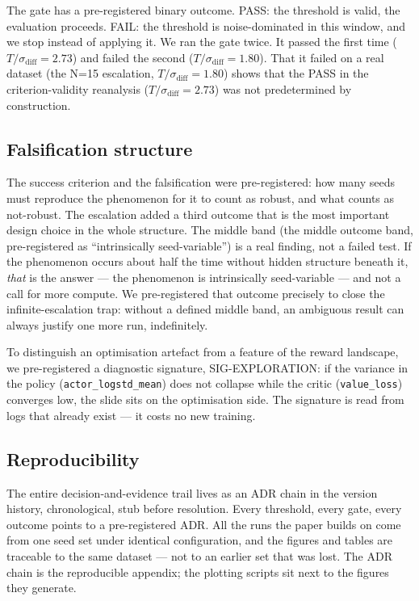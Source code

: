 \documentclass{article}
\newcommand{\code}[1]{\texttt{#1}}
\begin{document}
The gate has a pre-registered binary outcome. PASS: the threshold is valid, the evaluation proceeds. FAIL: the threshold is noise-dominated in this window, and we stop instead of applying it. We ran the gate twice. It passed the first time ($T/\sigma_\mathrm{diff} = 2.73$) and failed the second ($T/\sigma_\mathrm{diff} = 1.80$). That it failed on a real dataset (the N=15 escalation, $T/\sigma_\mathrm{diff} = 1.80$) shows that the PASS in the criterion-validity reanalysis ($T/\sigma_\mathrm{diff} = 2.73$) was not predetermined by construction.

\subsection{Falsification structure}
\label{sec:2.5}

The success criterion and the falsification were pre-registered: how many seeds must reproduce the phenomenon for it to count as robust, and what counts as not-robust. The escalation added a third outcome that is the most important design choice in the whole structure. The middle band (the middle outcome band, pre-registered as ``intrinsically seed-variable'') is a real finding, not a failed test. If the phenomenon occurs about half the time without hidden structure beneath it, \emph{that} is the answer --- the phenomenon is intrinsically seed-variable --- and not a call for more compute. We pre-registered that outcome precisely to close the infinite-escalation trap: without a defined middle band, an ambiguous result can always justify one more run, indefinitely.

{\sloppy
To distinguish an optimisation artefact from a feature of the reward landscape, we pre-registered a diagnostic signature, SIG-EXPLORATION: if the variance in the policy (\code{actor\_logstd\_mean}) does not collapse while the critic (\code{value\_loss}) converges low, the slide sits on the optimisation side. The signature is read from logs that already exist --- it costs no new training.\par}

\subsection{Reproducibility}
\label{sec:2.6}

The entire decision-and-evidence trail lives as an ADR chain in the version history, chronological, stub before resolution. Every threshold, every gate, every outcome points to a pre-registered ADR. All the runs the paper builds on come from one seed set under identical configuration, and the figures and tables are traceable to the same dataset --- not to an earlier set that was lost. The ADR chain is the reproducible appendix; the plotting scripts sit next to the figures they generate.
\end{document}
